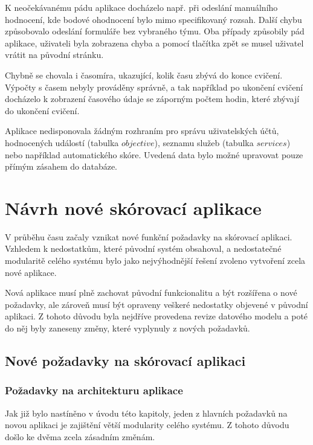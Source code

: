 \documentclass[
  digital, %
  twoside, %
  table,   %
  lof,     %
  lot,     %
]{fithesis3}
\begin{document}
K neočekávanému pádu aplikace docházelo např. při odeslání manuálního hodnocení, kde bodové ohodnocení bylo mimo specifikovaný rozsah. Další chybu způsobovalo odeslání formuláře bez vybraného týmu. Oba případy způsobily pád aplikace, uživateli byla zobrazena chyba a pomocí tlačítka zpět se musel uživatel vrátit na původní stránku.

Chybně se chovala i časomíra, ukazující, kolik času zbývá do konce cvičení. Výpočty s časem nebyly prováděny správně, a tak například po ukončení cvičení docházelo k zobrazení časového údaje se záporným počtem hodin, které zbývají do ukončení cvičení.

Aplikace nedisponovala žádným rozhraním pro správu uživatelských účtů, hodnocených událostí (tabulka $objective$), seznamu služeb (tabulka $services$) nebo například automatického skóre. Uvedená data bylo možné upravovat pouze přímým zásahem do databáze.

\chapter{Návrh nové skórovací aplikace}
V průběhu času začaly vznikat nové funkční požadavky na skórovací aplikaci. Vzhledem k nedostatkům, které původní systém obsahoval, a nedostatečné modularitě celého systému bylo jako nejvýhodnější řešení zvoleno vytvoření zcela nové aplikace. 

Nová aplikace musí plně zachovat původní funkcionalitu a být rozšířena o nové požadavky, ale zároveň musí být opraveny veškeré nedostatky objevené v původní aplikaci. Z tohoto důvodu byla nejdříve provedena revize datového modelu a poté do něj byly zaneseny změny, které vyplynuly z nových požadavků. 

\section{Nové požadavky na skórovací aplikaci}
\subsection{Požadavky na architekturu aplikace}

Jak již bylo nastíněno v úvodu této kapitoly, jeden z hlavních požadavků na novou aplikaci je zajištění větší modularity celého systému. Z tohoto důvodu došlo ke dvěma zcela zásadním změnám.
\end{document}
